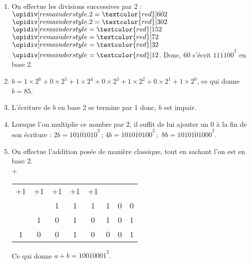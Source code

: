 \ \\ [-5mm]
   \begin{enumerate}
      \item On effectue les divisions successives par 2 : \\
      $\opidiv[remainderstyle.2=\textcolor{red}]{60}{2}$ \quad $\opidiv[remainderstyle.2=\textcolor{red}]{30}{2}$ \quad $\opidiv[remainderstyle=\textcolor{red}]{15}{2}$ \quad $\opidiv[remainderstyle=\textcolor{red}]{7}{2}$ \quad $\opidiv[remainderstyle=\textcolor{red}]{3}{2}$ \quad $\opidiv[remainderstyle=\textcolor{red}]{1}{2}$. \qquad Donc, 60 s'écrit {\blue $\overline{111100}^2$} en base 2. \\
      \item $b =1\times2^6+0\times2^5+1\times2^4+0\times2^3+1\times2^2+0\times2^1+1\times2^0$, ce qui donne {\blue $b = 85$}.
      \item L'écriture de $b$ en base 2 se termine par 1 donc, {\blue $b$ est impair}.
      \item Lorsque l'on multiplie ce nombre par 2, il suffit de lui ajouter un 0 à la fin de son écriture : {\blue $2b =\overline{10101010}^2\,;\, 4b =\overline{101010100}^2$}\,;\, {\blue $8b =\overline{1010101000}^2$}. \\
       \item On effectue l'addition posée de manière classique, tout en sachant l'on est en base 2. \\ \hspace*{1cm} +\begin{tabular}{cccccccc}
            \tiny +1 & \tiny +1 & \tiny +1 & \tiny +1 & \tiny +1 & & & \\
            & & 1 & 1 & 1 & 1 & 0 & 0 \\
            & 1 & 0 & 1 & 0 & 1 & 0 & 1 \\
            \hline
            1 & 0 & 0 & 1 & 0 & 0 & 0 & 1 \\
         \end{tabular}
   \qquad Ce qui donne {\blue $a+b =\overline{10010001}^2$}.
   \end{enumerate}
